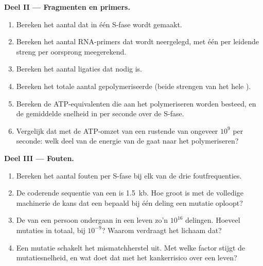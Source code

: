\begin{problem}
\medskip
\noindent\textbf{Deel II --- Fragmenten en primers.}
\begin{enumerate}[resume]
  \item Bereken het aantal  dat in één S-fase wordt
        gemaakt.
  \item Bereken het aantal RNA-primers dat wordt neergelegd, met één per
        leidende streng per oorsprong meegerekend.
  \item Bereken het aantal ligaties dat nodig is.
  \item Bereken het totale aantal gepolymeriseerde  (beide
        strengen van het hele ).
  \item Bereken de ATP-equivalenten die aan het polymeriseren worden
        besteed, en de gemiddelde snelheid in  per seconde over de
        S-fase.
  \item Vergelijk dat met de ATP-omzet van een rustende  van ongeveer
        $10^9$ per seconde: welk deel van de energie van de  gaat naar
        het polymeriseren?
\end{enumerate}

\medskip
\noindent\textbf{Deel III --- Fouten.}
\begin{enumerate}[resume]
  \item Bereken het aantal fouten per S-fase bij elk van de drie
        foutfrequenties.
  \item De coderende sequentie van een  is \qty{1.5}{kb}. Hoe groot is
        met de volledige machinerie de kans dat een bepaald  bij één
        deling een mutatie oploopt?
  \item De  van een persoon ondergaan in een leven zo'n $10^{16}$
        delingen. Hoeveel mutaties in totaal, bij $10^{-9}$? Waarom
        verdraagt het lichaam dat?
  \item Een mutatie schakelt het mismatchherstel uit. Met welke factor
        stijgt de mutatiesnelheid, en wat doet dat met het kankerrisico
        over een leven?
\end{enumerate}


\end{problem}
